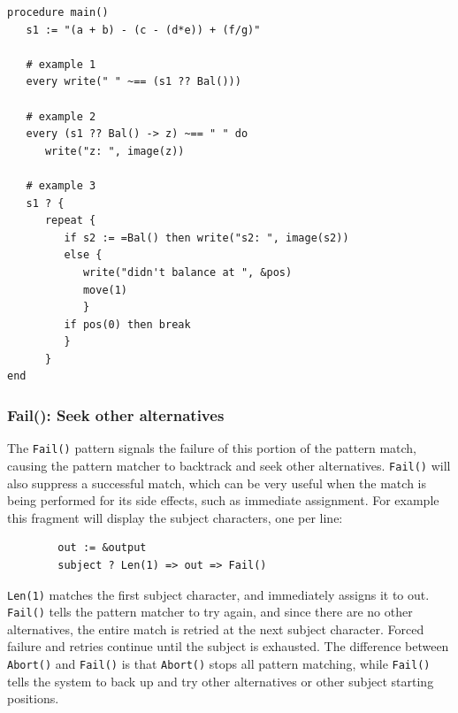 \documentclass[letterpaper,12pt]{article}
\begin{document}
\begin{verbatim}
procedure main()                                                                
   s1 := "(a + b) - (c - (d*e)) + (f/g)"

   # example 1
   every write(" " ~== (s1 ?? Bal()))

   # example 2
   every (s1 ?? Bal() -> z) ~== " " do
      write("z: ", image(z))                                                    

   # example 3
   s1 ? {                                                                       
      repeat {                                                                  
         if s2 := =Bal() then write("s2: ", image(s2))                          
         else {                                                                 
            write("didn't balance at ", &pos)                                   
            move(1)                                                             
            }                                                                   
         if pos(0) then break                                                   
         }                                                                      
      }                                                                         
end
\end{verbatim}

\subsubsection{Fail(): Seek other alternatives}

The {\tt Fail()} pattern signals the failure of this portion of the pattern
match, causing the pattern matcher to backtrack and seek other
alternatives. {\tt Fail()} will also suppress a successful match, which can
be very useful when the match is being performed for its side effects,
such as immediate assignment. For example this fragment will display
the subject characters, one per line:

\begin{verbatim}
        out := &output
        subject ? Len(1) => out => Fail()
\end{verbatim}

{\tt Len(1)} matches the first subject character, and immediately assigns
it to out. {\tt Fail()} tells the pattern matcher to try again, and since
there are no other alternatives, the entire match is retried at the
next subject character. Forced failure and retries continue until the
subject is exhausted. The difference between {\tt Abort()} and {\tt Fail()}
is that {\tt Abort()} stops all pattern matching, while {\tt Fail()} tells
the system to back up and try other alternatives or other subject starting
positions.
\end{document}

